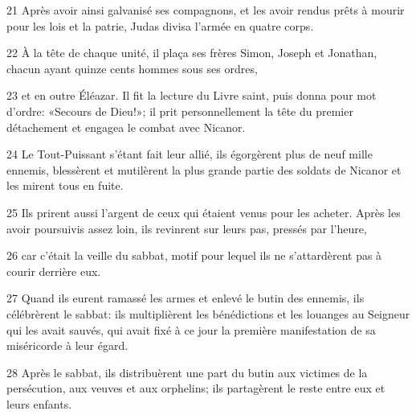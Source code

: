
21 Après avoir ainsi galvanisé ses compagnons, et les avoir rendus prêts à mourir pour les lois et la patrie, Judas divisa l’armée en quatre corps.

22 À la tête de chaque unité, il plaça ses frères Simon, Joseph et Jonathan, chacun ayant quinze cents hommes sous ses ordres,

23 et en outre Éléazar. Il fit la lecture du Livre saint, puis donna pour mot d’ordre: «Secours de Dieu!»; il prit personnellement la tête du premier détachement et engagea le combat avec Nicanor.

24 Le Tout-Puissant s’étant fait leur allié, ils égorgèrent plus de neuf mille ennemis, blessèrent et mutilèrent la plus grande partie des soldats de Nicanor et les mirent tous en fuite.

25 Ils prirent aussi l’argent de ceux qui étaient venus pour les acheter. Après les avoir poursuivis assez loin, ils revinrent sur leurs pas, pressés par l’heure,

26 car c’était la veille du sabbat, motif pour lequel ils ne s’attardèrent pas à courir derrière eux.

27 Quand ils eurent ramassé les armes et enlevé le butin des ennemis, ils célébrèrent le sabbat: ils multiplièrent les bénédictions et les louanges au Seigneur qui les avait sauvés, qui avait fixé à ce jour la première manifestation de sa miséricorde à leur égard.

28 Après le sabbat, ils distribuèrent une part du butin aux victimes de la persécution, aux veuves et aux orphelins; ils partagèrent le reste entre eux et leurs enfants.